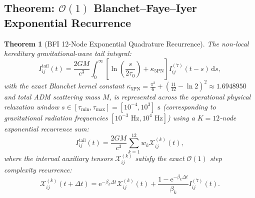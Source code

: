 \documentclass[11pt,a4paper,reqno]{article}
\theoremstyle{plain}
\newtheorem{theorem}{Theorem}[section]
\theoremstyle{definition}
\theoremstyle{remark}
\numberwithin{equation}{section}
\numberwithin{table}{section}
\providecommand{\diff}{\mathrm{d}}
\begin{document}
\subsection{Theorem: \texorpdfstring{$\mathcal{O}(1)$}{O(1)} Blanchet--Faye--Iyer Exponential Recurrence}
\begin{theorem}[BFI 12-Node Exponential Quadrature Recurrence]
\label{thm:bfi_exponential_recurrence}
The non-local hereditary gravitational-wave tail integral:
\begin{equation}
  I_{ij}^{\mathrm{tail}}(t) = \frac{2GM}{c^3} \int_0^\infty \left[ \ln\left(\frac{s}{2\tau_0}\right) + \kappa_{5\mathrm{PN}} \right] I_{ij}^{(7)}(t-s) \, \diff s,
  \label{eq:tail_integral_integral}
\end{equation}
with the exact Blanchet kernel constant $\kappa_{5\mathrm{PN}} = \frac{\pi^2}{6} + \left(\frac{11}{12} - \ln 2\right)^2 \approx 1.6948950$ and total ADM scattering mass $M$, is represented across the operational physical relaxation window $s \in [\tau_{\min}, \tau_{\max}] = [10^{-4}, 10^3]\text{ s}$ (corresponding to gravitational radiation frequencies $[10^{-3}\text{ Hz}, 10^4\text{ Hz}]$) using a $K=12$-node exponential recurrence sum:
\begin{equation}
  I_{ij}^{\mathrm{tail}}(t) = \frac{2GM}{c^3} \sum_{k=1}^{12} w_k \mathcal{X}_{ij}^{(k)}(t),
  \label{eq:tail_sum_def}
\end{equation}
where the internal auxiliary tensors $\mathcal{X}_{ij}^{(k)}$ satisfy the exact $\mathcal{O}(1)$ step complexity recurrence:
\begin{equation}
  \mathcal{X}_{ij}^{(k)}(t + \Delta t) = \mathrm{e}^{-\beta_k \Delta t} \mathcal{X}_{ij}^{(k)}(t) + \frac{1 - \mathrm{e}^{-\beta_k \Delta t}}{\beta_k} I_{ij}^{(7)}(t).
  \label{eq:bfi_recurrence_step}
\end{equation}
\end{theorem}
\end{document}
